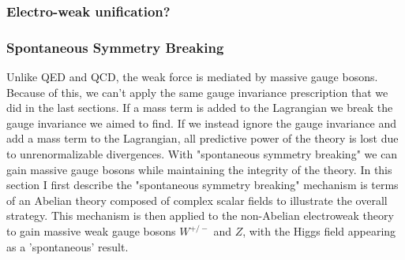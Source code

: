 \subsubsection{Electro-weak unification?}

\subsubsection{Spontaneous Symmetry Breaking}
Unlike QED and QCD, the weak force is mediated by massive gauge bosons. Because of this, we can't apply the same gauge invariance prescription that we did in the last sections. If a mass term is added to the Lagrangian we break the gauge invariance we aimed to find. If we instead ignore the gauge invariance and add a mass term to the Lagrangian, all predictive power of the theory is lost due to unrenormalizable divergences. With "spontaneous symmetry breaking" we can gain massive gauge bosons while maintaining the integrity of the theory. In this section I first describe the "spontaneous symmetry breaking" mechanism is terms of an Abelian theory composed of complex scalar fields to illustrate the overall strategy. This mechanism is then applied to the non-Abelian electroweak theory to gain massive weak gauge bosons $W^{+/-}$ and $Z$, with the Higgs field appearing as a 'spontaneous' result.


